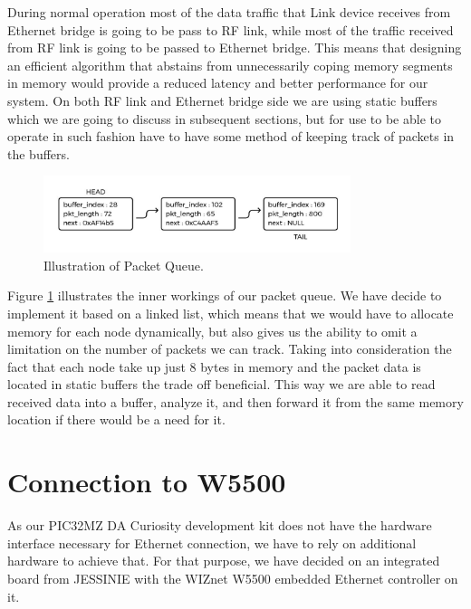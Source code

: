 During normal operation most of the data traffic that Link device receives from Ethernet bridge is going to be pass to RF link, while most of the traffic received from RF link is going to be passed to Ethernet bridge. This means that designing an efficient algorithm that abstains from unnecessarily coping memory segments in memory would provide a reduced latency and better performance for our system. On both RF link and Ethernet bridge side we are using static buffers which we are going to discuss in subsequent sections, but for use to be able to operate in such fashion have to have some method of keeping track of packets in the buffers.  

\begin{figure}[htp]
\begin{center}
\includegraphics[width=0.8\textwidth]{queue-pkt-struct}
\end{center}
\caption{Illustration of Packet Queue.}
\label{pkt-queue-stuct}
\end{figure}

Figure \ref{pkt-queue-stuct} illustrates the inner workings of our packet queue. We have decide to implement it based on a linked list, which means that we would have to allocate memory for each node dynamically, but also gives us the ability to omit a limitation on the number of packets we can track. Taking into consideration the fact that each node take up just 8 bytes in memory and the packet data is located in static buffers the trade off beneficial. This way we are able to read received data into a buffer, analyze it, and then forward it from the same memory location if there would be a need for it.  

\section{Connection to W5500}

As our PIC32MZ DA Curiosity development kit does not have the hardware interface necessary for Ethernet connection, we have to rely on additional hardware to achieve that. For that purpose, we have decided on an integrated board from JESSINIE with the WIZnet W5500 embedded Ethernet controller on it.

